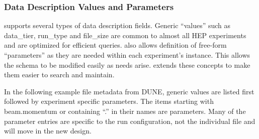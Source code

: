 \documentclass[../main-v1.tex]{subfiles}
\begin{document}
\subsubsection{Data Description Values and Parameters}

  supports several types of data description fields.
  Generic ``values'' such as data\_tier, run\_type and file\_size  are common to almost all  HEP experiments and are optimized for efficient queries.   also allows definition of free-form ``parameters'' as they are needed within each experiment's instance.  This allows the schema to be modified easily as needs arise.   extends these concepts to make them easier to search and maintain. 






In the following example file metadata from DUNE, generic  values are listed first followed by experiment specific parameters. The items starting with beam.momentum or containing ``.'' in their names are parameters. Many of the parameter entries are specific to the run configuration, not the individual file and will move in the new design. 
\end{document}

